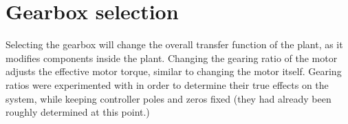 \section{Gearbox selection}

Selecting the gearbox will change the overall transfer function of the plant, as it modifies components inside the plant. Changing the gearing ratio of the motor adjusts the effective motor torque, similar to changing the motor itself. Gearing ratios were experimented with in order to determine their true effects on the system, while keeping controller poles and zeros fixed (they had already been roughly determined at this point.)

